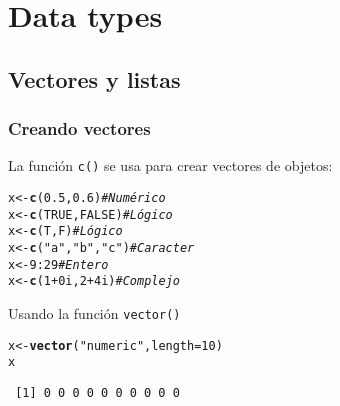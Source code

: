 \documentclass{article}\usepackage[]{graphicx}\usepackage[]{color}
\makeatletter
\newcommand{\hlnum}[1]{\textcolor[rgb]{0.686,0.059,0.569}{#1}}%
\newcommand{\hlstr}[1]{\textcolor[rgb]{0.192,0.494,0.8}{#1}}%
\newcommand{\hlcom}[1]{\textcolor[rgb]{0.678,0.584,0.686}{\textit{#1}}}%
\newcommand{\hlopt}[1]{\textcolor[rgb]{0,0,0}{#1}}%
\newcommand{\hlstd}[1]{\textcolor[rgb]{0.345,0.345,0.345}{#1}}%
\newcommand{\hlkwb}[1]{\textcolor[rgb]{0.69,0.353,0.396}{#1}}%
\newcommand{\hlkwc}[1]{\textcolor[rgb]{0.333,0.667,0.333}{#1}}%
\newcommand{\hlkwd}[1]{\textcolor[rgb]{0.737,0.353,0.396}{\textbf{#1}}}%
\newenvironment{kframe}{%
 \def\at@end@of@kframe{}%
 \ifinner\ifhmode%
  \def\at@end@of@kframe{\end{minipage}}%
  \begin{minipage}{\columnwidth}%
 \fi\fi%
 \def\FrameCommand##1{\hskip\@totalleftmargin \hskip-\fboxsep
 \colorbox{shadecolor}{##1}\hskip-\fboxsep
     \hskip-\linewidth \hskip-\@totalleftmargin \hskip\columnwidth}%
 \MakeFramed {\advance\hsize-\width
   \@totalleftmargin\z@ \linewidth\hsize
   \@setminipage}}%
 {\par\unskip\endMakeFramed%
 \at@end@of@kframe}
\newenvironment{knitrout}{}{} %
\makeatother
\begin{document}
\section{Data types}
  \subsection{Vectores y listas}
    \subsubsection{Creando vectores}
      La función \texttt{c()} se usa para crear vectores de objetos:
\begin{knitrout}
\color{fgcolor}\begin{kframe}
\begin{alltt}
  \hlstd{x} \hlkwb{<-} \hlkwd{c}\hlstd{(}\hlnum{0.5}\hlstd{,} \hlnum{0.6}\hlstd{)}      \hlcom{# Numérico}
  \hlstd{x} \hlkwb{<-} \hlkwd{c}\hlstd{(}\hlnum{TRUE}\hlstd{,} \hlnum{FALSE}\hlstd{)}   \hlcom{# Lógico}
  \hlstd{x} \hlkwb{<-} \hlkwd{c}\hlstd{(T, F)}          \hlcom{# Lógico}
  \hlstd{x} \hlkwb{<-} \hlkwd{c}\hlstd{(}\hlstr{"a"}\hlstd{,} \hlstr{"b"}\hlstd{,}\hlstr{"c"}\hlstd{)}  \hlcom{# Caracter}
  \hlstd{x} \hlkwb{<-} \hlnum{9}\hlopt{:}\hlnum{29}             \hlcom{# Entero}
  \hlstd{x} \hlkwb{<-} \hlkwd{c}\hlstd{(}\hlnum{1}\hlopt{+}\hlnum{0i}\hlstd{,} \hlnum{2}\hlopt{+}\hlnum{4i}\hlstd{)}    \hlcom{# Complejo}
\end{alltt}
\end{kframe}
\end{knitrout}

      Usando la función \texttt{vector()}
\begin{knitrout}
\color{fgcolor}\begin{kframe}
\begin{alltt}
  \hlstd{x} \hlkwb{<-} \hlkwd{vector}\hlstd{(}\hlstr{"numeric"}\hlstd{,} \hlkwc{length} \hlstd{=} \hlnum{10}\hlstd{)}
  \hlstd{x}
\end{alltt}
\begin{verbatim}
 [1] 0 0 0 0 0 0 0 0 0 0
\end{verbatim}
\end{kframe}
\end{knitrout}
\end{document}
